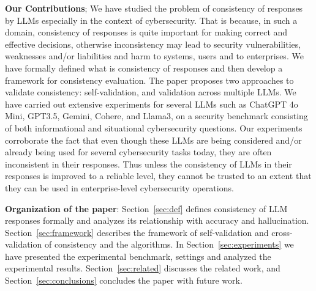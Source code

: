 {\bf Our Contributions};
We have studied the problem of consistency of responses by LLMs especially in the context of cybersecurity. That is because, in such a domain, consistency of responses is quite important for making correct and effective decisions, otherwise inconsistency may lead to security vulnerabilities, weaknesses and/or liabilities and harm to systems, users and to enterprises. We have formally defined what is consistency of responses and then develop a framework for consistency evaluation. The paper proposes two approaches to validate consistency: self-validation, and validation across multiple LLMs. We have carried out extensive experiments for several LLMs such as ChatGPT 4o Mini, GPT3.5, Gemini, Cohere, and Llama3, on a security benchmark consisting of both informational and situational cybersecurity questions. Our experiments corroborate the fact that even though these LLMs are being considered and/or already being used for several cybersecurity tasks today, they are often inconsistent in their responses. Thus unless the consistency of LLMs in their responses is improved to a reliable level, they cannot be trusted to an extent that they can be used in enterprise-level cybersecurity operations. 

{\bf Organization of the paper}: Section~\ref{sec:def} defines consistency of LLM responses formally and analyzes its relationship with accuracy and hallucination.  Section~\ref{sec:framework} describes the framework of self-validation and cross-validation of consistency and the algorithms. In Section~\ref{sec:experiments} we have presented the experimental benchmark, settings and analyzed the experimental results. Section~\ref{sec:related} discusses the related work, and Section~\ref{sec:conclusions} concludes the paper with future work. 